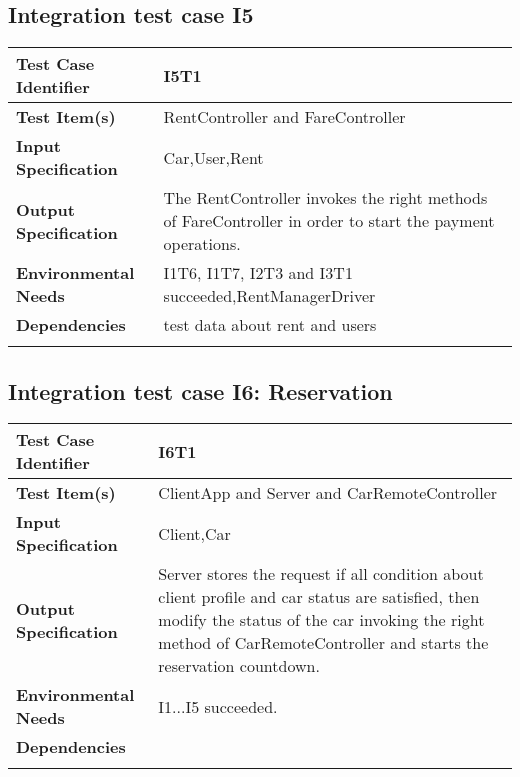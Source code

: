 \subsection{Integration test case I5}

\begin{center}
\begin{tabular*}
{\textwidth}
{l p{10.5cm}}

\hline
\textbf{Test Case Identifier} & I5T1 \\
\hline
\textbf{Test Item(s)} &  RentController and FareController   \\
\hline
\textbf{Input Specification} & Car,User,Rent\\
\hline
\textbf{Output Specification} & The RentController invokes the right methods of FareController in order to start the payment operations.\\
\hline
\textbf{Environmental Needs} & I1T6, I1T7, I2T3 and I3T1 succeeded,RentManagerDriver\\
\hline
\textbf{Dependencies} &   test data about rent and users\\%
\hline
\newline
\newline
\end{tabular*}
\end{center}






\subsection{Integration test case I6: Reservation}

\begin{center}
\begin{tabular*}
{\textwidth}
{l p{10.5cm}}

\hline
\textbf{Test Case Identifier} & I6T1 \\
\hline
\textbf{Test Item(s)} & ClientApp and Server and CarRemoteController   \\
\hline
\textbf{Input Specification} & Client,Car \\
\hline
\textbf{Output Specification} & Server stores the request if all condition about client profile and car status are satisfied, then modify the status of the car invoking the right method of CarRemoteController and starts the reservation countdown.\\
\hline
\textbf{Environmental Needs} & I1...I5 succeeded. \\
\hline
\textbf{Dependencies} &  \\
\hline
\newline
\newline
\end{tabular*}
\end{center}


